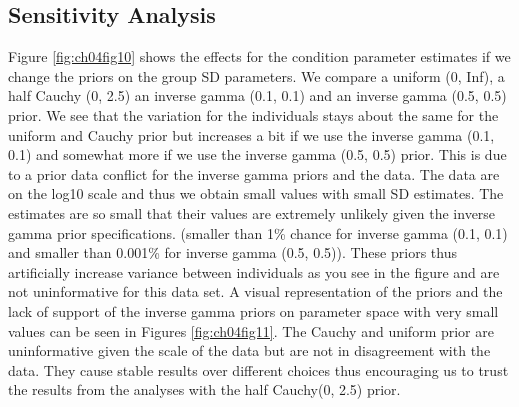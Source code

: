 \documentclass[openright,titlepage,12pt,a4paper]{book}
\begin{document}
\hypertarget{sensitivity-analysis}{%
\subsection{Sensitivity Analysis}\label{sensitivity-analysis}}

Figure \ref{fig:ch04fig10} shows the effects for the condition parameter estimates if we change the priors on the group SD parameters. We compare a uniform (0, Inf), a half Cauchy (0, 2.5) an inverse gamma (0.1, 0.1) and an inverse gamma (0.5, 0.5) prior. We see that the variation for the individuals stays about the same for the uniform and Cauchy prior but increases a bit if we use the inverse gamma (0.1, 0.1) and somewhat more if we use the inverse gamma (0.5, 0.5) prior. This is due to a prior data conflict for the inverse gamma priors and the data. The data are on the log10 scale and thus we obtain small values with small SD estimates. The estimates are so small that their values are extremely unlikely given the inverse gamma prior specifications. (smaller than 1\% chance for inverse gamma (0.1, 0.1) and smaller than 0.001\% for inverse gamma (0.5, 0.5)). These priors thus artificially increase variance between individuals as you see in the figure and are not uninformative for this data set. A visual representation of the priors and the lack of support of the inverse gamma priors on parameter space with very small values can be seen in Figures \ref{fig:ch04fig11}. The Cauchy and uniform prior are uninformative given the scale of the data but are not in disagreement with the data. They cause stable results over different choices thus encouraging us to trust the results from the analyses with the half Cauchy(0, 2.5) prior.
\end{document}
